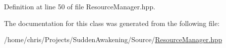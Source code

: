 Definition at line 50 of file Resource\-Manager.\-hpp.



The documentation for this class was generated from the following file\-:\begin{DoxyCompactItemize}
\item 
/home/chris/\-Projects/\-Sudden\-Awakening/\-Source/\hyperlink{_resource_manager_8hpp}{Resource\-Manager.\-hpp}\end{DoxyCompactItemize}
